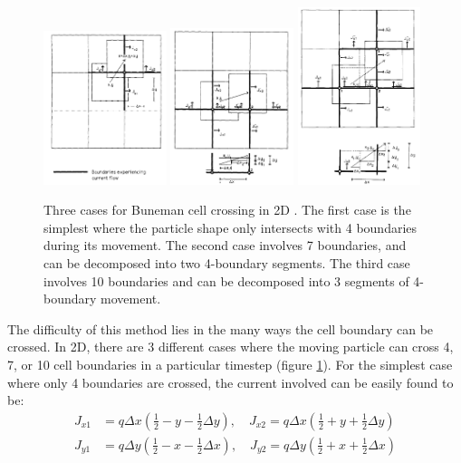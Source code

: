 \begin{figure}[h]
  \centering
  \includegraphics[width=0.32\textwidth]{pics/chap1/buneman-1.png}
  \includegraphics[width=0.32\textwidth]{pics/chap1/buneman-2.png}
  \includegraphics[width=0.32\textwidth]{pics/chap1/buneman-3.png}
  \caption[Three cases for Buneman cell crossing in 2D.]{Three cases for Buneman
    cell crossing in 2D \citep{villasenor_rigorous_1992}. The first case is the
    simplest where the particle shape only intersects with 4 boundaries during
    its movement. The second case involves 7 boundaries, and can be decomposed
    into two 4-boundary segments. The third case involves 10 boundaries and can
    be decomposed into 3 segments of 4-boundary movement.}
  \label{fig:buneman}
\end{figure}

The difficulty of this method lies in the many ways the cell boundary can be
crossed. In 2D, there are 3 different cases where the moving particle can cross
4, 7, or 10 cell boundaries in a particular timestep (figure \ref{fig:buneman}).
For the simplest case where only 4 boundaries are crossed, the current involved
can be easily found to be:
\begin{align}
  \label{eq:buneman-4-cross}
  J_{x1} &= q\Delta x \left( \frac{1}{2} - y - \frac{1}{2}\Delta y \right) ,\quad J_{x2} = q\Delta x \left( \frac{1}{2} + y + \frac{1}{2}\Delta y \right) \\
  J_{y1} &= q\Delta y \left( \frac{1}{2} - x - \frac{1}{2}\Delta x \right) ,\quad J_{y2} = q\Delta y \left( \frac{1}{2} + x + \frac{1}{2}\Delta x \right)
\end{align}

